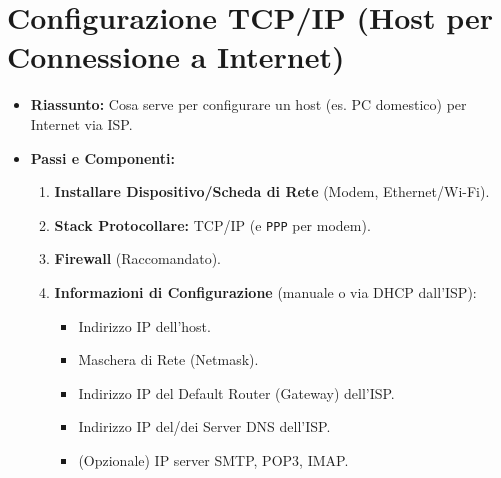\section{Configurazione TCP/IP (Host per Connessione a Internet)}
\begin{itemize}
    \item \textbf{Riassunto:} Cosa serve per configurare un host (es. PC domestico) per Internet via ISP.
    \item \textbf{Passi e Componenti:}
    \begin{enumerate}
        \item \textbf{Installare Dispositivo/Scheda di Rete} (Modem, Ethernet/Wi-Fi).
        \item \textbf{Stack Protocollare:} TCP/IP (e \texttt{PPP} per modem).
        \item \textbf{Firewall} (Raccomandato).
        \item \textbf{Informazioni di Configurazione} (manuale o via DHCP dall'ISP):
        \begin{itemize}
            \item Indirizzo IP dell'host.
            \item Maschera di Rete (Netmask).
            \item Indirizzo IP del Default Router (Gateway) dell'ISP.
            \item Indirizzo IP del/dei Server DNS dell'ISP.
            \item (Opzionale) IP server SMTP, POP3, IMAP.
        \end{itemize}
    \end{enumerate}
\end{itemize}

